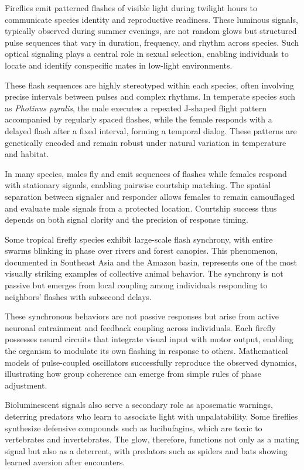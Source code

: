 Fireflies emit patterned flashes of visible light during twilight hours to communicate species identity and reproductive readiness. These luminous signals, typically observed during summer evenings, are not random glows but structured pulse sequences that vary in duration, frequency, and rhythm across species. Such optical signaling plays a central role in sexual selection, enabling individuals to locate and identify conspecific mates in low-light environments.

These flash sequences are highly stereotyped within each species, often involving precise intervals between pulses and complex rhythms. In temperate species such as \emph{Photinus pyralis}, the male executes a repeated J-shaped flight pattern accompanied by regularly spaced flashes, while the female responds with a delayed flash after a fixed interval, forming a temporal dialog. These patterns are genetically encoded and remain robust under natural variation in temperature and habitat.

In many species, males fly and emit sequences of flashes while females respond with stationary signals, enabling pairwise courtship matching. The spatial separation between signaler and responder allows females to remain camouflaged and evaluate male signals from a protected location. Courtship success thus depends on both signal clarity and the precision of response timing.

Some tropical firefly species exhibit large-scale flash synchrony, with entire swarms blinking in phase over rivers and forest canopies. This phenomenon, documented in Southeast Asia and the Amazon basin, represents one of the most visually striking examples of collective animal behavior. The synchrony is not passive but emerges from local coupling among individuals responding to neighbors' flashes with subsecond delays.

These synchronous behaviors are not passive responses but arise from active neuronal entrainment and feedback coupling across individuals. Each firefly possesses neural circuits that integrate visual input with motor output, enabling the organism to modulate its own flashing in response to others. Mathematical models of pulse-coupled oscillators successfully reproduce the observed dynamics, illustrating how group coherence can emerge from simple rules of phase adjustment.

Bioluminescent signals also serve a secondary role as aposematic warnings, deterring predators who learn to associate light with unpalatability. Some fireflies synthesize defensive compounds such as lucibufagins, which are toxic to vertebrates and invertebrates. The glow, therefore, functions not only as a mating signal but also as a deterrent, with predators such as spiders and bats showing learned aversion after encounters.

